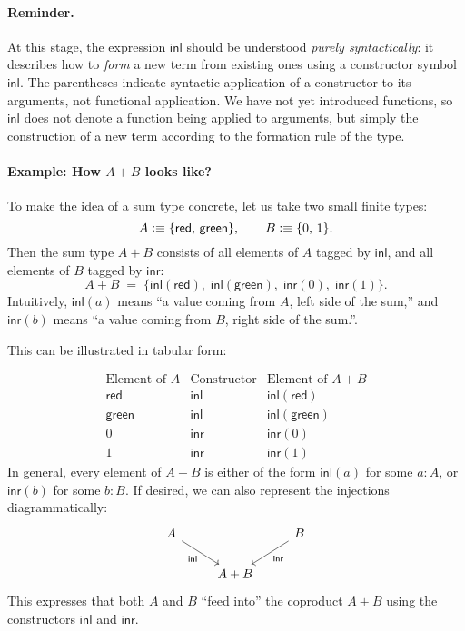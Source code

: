 \documentclass{article}
\newcommand{\defeq}{\vcentcolon\equiv}
\newcommand{\inl}{\mathsf{inl}}
\newcommand{\inr}{\mathsf{inr}}
\begin{document}
\paragraph{Reminder.} At this stage, the expression \(\inl\) should be understood \emph{purely syntactically}: it describes how to \emph{form} a new term from existing ones using a constructor symbol \( \inl \). The parentheses indicate syntactic application of a constructor to its arguments, not functional application. We have not yet introduced functions, so \( \inl \) does not denote a function being applied to arguments, but simply the construction of a new term according to the formation rule of the type.

\paragraph{Example: How \(A + B\) looks like?}

To make the idea of a sum type concrete, let us take two small finite types:
\[
A \defeq \{\mathsf{red},\, \mathsf{green}\}, 
\qquad
B \defeq \{0,\,1\}.
\]
Then the sum type \(A + B\) consists of all elements of \(A\) tagged by \(\inl\),
and all elements of \(B\) tagged by \(\inr\):
\[
A + B \;=\;
\{\inl(\mathsf{red}),\; \inl(\mathsf{green}),\;
  \inr(0),\; \inr(1)\}.
\]
Intuitively, \(\inl(a)\) means “a value coming from \(A\), left side of the sum,” and
\(\inr(b)\) means “a value coming from \(B\), right side of the sum.”. 

\bigskip
\noindent
This can be illustrated in tabular form:

\[
\begin{array}{c|c|c}
\text{Element of } A & \text{Constructor} & \text{Element of } A + B \\ \hline
\mathsf{red} & \inl & \inl(\mathsf{red}) \\
\mathsf{green} & \inl & \inl(\mathsf{green}) \\ \hline
0 & \inr & \inr(0) \\
1 & \inr & \inr(1)
\end{array}
\]
In general, every element of \(A + B\) is either of the form
\(\inl(a)\) for some \(a : A\), or \(\inr(b)\) for some \(b : B\). If desired, we can also represent the injections diagrammatically:
\[
\begin{tikzcd}
A \arrow[dr, "\inl"'] & & B \arrow[dl, "\inr"] \\
& A + B &
\end{tikzcd}
\]
This expresses that both \(A\) and \(B\) “feed into” the coproduct \(A + B\) using the constructors $\inl$ and $\inr$.
\end{document}
